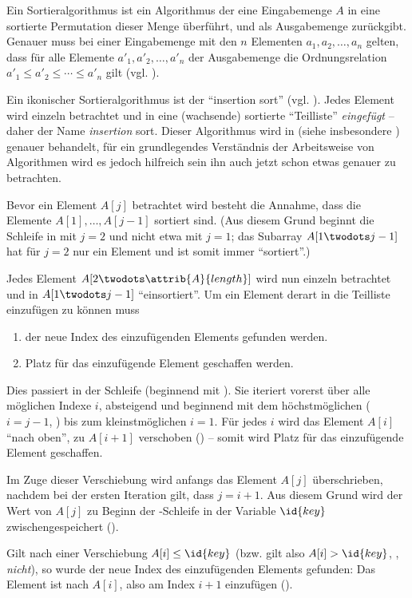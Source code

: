 
Ein Sortieralgorithmus ist ein Algorithmus der eine Eingabemenge $A$ in eine sortierte Permutation dieser Menge überführt, und als Ausgabemenge zurückgibt. Genauer muss bei einer Eingabemenge mit den $n$ Elementen $a_1, a_2, \ldots, a_n$ gelten, dass für alle Elemente $a'_1, a'_2, \ldots, a'_n$ der Ausgabemenge die Ordnungsrelation $a'_1 \leq a'_2 \leq \cdots \leq a'_n$ gilt (vgl. \cite[4]{taocp3}).

Ein ikonischer Sortieralgorithmus ist der \enquote{insertion sort} (vgl. \cite[74]{taocp3}). Jedes Element wird einzeln betrachtet und in eine (wachsende) sortierte \enquote{Teilliste} \emph{eingefügt} -- daher der Name \emph{insertion} sort. Dieser Algorithmus wird in  (siehe insbesondere ) genauer behandelt, für ein grundlegendes Verständnis der Arbeitsweise von Algorithmen wird es jedoch hilfreich sein ihn auch jetzt schon etwas genauer zu betrachten.



Bevor ein Element $A[j]$ betrachtet wird besteht die Annahme, dass die Elemente $A[1], \ldots, A[j - 1]$ sortiert sind. (Aus diesem Grund beginnt die \For Schleife in  mit $j = 2$ und nicht etwa mit $j = 1$; das Subarray $A[1 \twodots j - 1]$ hat für $j = 2$ nur ein Element und ist somit immer \enquote{sortiert}.)

Jedes Element $A[2 \twodots \attrib{A}{length}]$ wird nun einzeln betrachtet und in $A[1 \twodots j - 1]$ \enquote{einsortiert}. Um ein Element derart in die Teilliste einzufügen zu können muss
\begin{enumerate}[nosep, label=(\alph*)]
    \item der neue Index des einzufügenden Elements gefunden werden.
    \item Platz für das einzufügende Element geschaffen werden.
\end{enumerate}
Dies passiert in der \While Schleife (beginnend mit ). Sie iteriert vorerst über alle möglichen Indexe $i$, absteigend und beginnend mit dem höchstmöglichen ($i = j - 1$, ) bis zum kleinstmöglichen $i = 1$. Für jedes $i$ wird das Element $A[i]$ \enquote{nach oben}, zu $A[i + 1]$ verschoben () -- somit wird Platz für das einzufügende Element geschaffen. 

Im Zuge dieser Verschiebung wird anfangs das Element $A[j]$ überschrieben, nachdem bei der ersten Iteration gilt, dass $j = i + 1$. Aus diesem Grund wird der Wert von $A[j]$ zu Beginn der \For-Schleife in der Variable $\id{key}$ zwischengespeichert ().

Gilt nach einer Verschiebung $A[i] \leq \id{key}$ (bzw. gilt also $A[i] > \id{key}$, , \emph{nicht}), so wurde der neue Index des einzufügenden Elements gefunden: Das Element ist nach $A[i]$, also am Index $i + 1$ einzufügen ().
